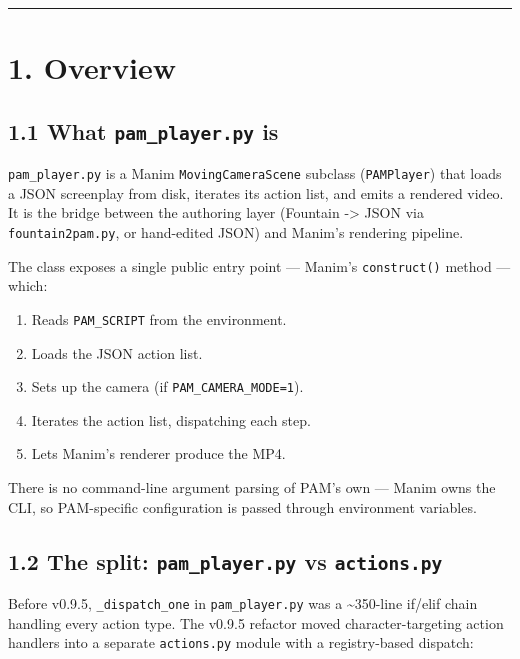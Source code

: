 \documentclass[
  11pt,
]{book}
\providecommand{\tightlist}{%
  \setlength{\itemsep}{0pt}\setlength{\parskip}{0pt}}
\begin{document}
\begin{center}\rule{0.5\linewidth}{0.5pt}\end{center}

\section{1. Overview}\label{overview}

\subsection{\texorpdfstring{1.1 What \texttt{pam\_player.py}
is}{1.1 What pam\_player.py is}}\label{what-pam_player.py-is}

\texttt{pam\_player.py} is a Manim \texttt{MovingCameraScene} subclass
(\texttt{PAMPlayer}) that loads a JSON screenplay from disk, iterates
its action list, and emits a rendered video. It is the bridge between
the authoring layer (Fountain -\textgreater{} JSON via
\texttt{fountain2pam.py}, or hand-edited JSON) and Manim's rendering
pipeline.

The class exposes a single public entry point --- Manim's
\texttt{construct()} method --- which:

\begin{enumerate}
\def\labelenumi{\arabic{enumi}.}
\tightlist
\item
  Reads \texttt{PAM\_SCRIPT} from the environment.
\item
  Loads the JSON action list.
\item
  Sets up the camera (if \texttt{PAM\_CAMERA\_MODE=1}).
\item
  Iterates the action list, dispatching each step.
\item
  Lets Manim's renderer produce the MP4.
\end{enumerate}

There is no command-line argument parsing of PAM's own --- Manim owns
the CLI, so PAM-specific configuration is passed through environment
variables.

\subsection{\texorpdfstring{1.2 The split: \texttt{pam\_player.py} vs
\texttt{actions.py}}{1.2 The split: pam\_player.py vs actions.py}}\label{the-split-pam_player.py-vs-actions.py}

Before v0.9.5, \texttt{\_dispatch\_one} in \texttt{pam\_player.py} was a
\textasciitilde350-line if/elif chain handling every action type. The
v0.9.5 refactor moved character-targeting action handlers into a
separate \texttt{actions.py} module with a registry-based dispatch:
\end{document}
